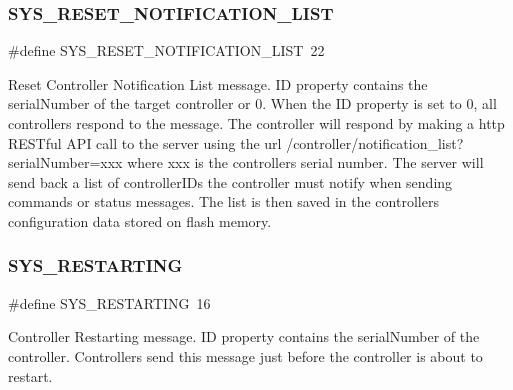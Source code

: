 \subsubsection{\texorpdfstring{S\+Y\+S\+\_\+\+R\+E\+S\+E\+T\+\_\+\+N\+O\+T\+I\+F\+I\+C\+A\+T\+I\+O\+N\+\_\+\+L\+I\+ST}{SYS\_RESET\_NOTIFICATION\_LIST}}
{\footnotesize\ttfamily \#define S\+Y\+S\+\_\+\+R\+E\+S\+E\+T\+\_\+\+N\+O\+T\+I\+F\+I\+C\+A\+T\+I\+O\+N\+\_\+\+L\+I\+ST~22}

Reset Controller Notification List message. ID property contains the serial\+Number of the target controller or 0. When the ID property is set to 0, all controllers respond to the message. The controller will respond by making a http R\+E\+S\+Tful A\+PI call to the server using the url /controller/notification\+\_\+list?serial\+Number=xxx where xxx is the controller\textquotesingle{}s serial number. The server will send back a list of controller\+I\+Ds the controller must notify when sending commands or status messages. The list is then saved in the controller\textquotesingle{}s configuration data stored on flash memory. \mbox{\label{group___u_d_p_message_i_d_ga9ed42f3a7fcc253fa49ce8ff33a75422}} 
\subsubsection{\texorpdfstring{S\+Y\+S\+\_\+\+R\+E\+S\+T\+A\+R\+T\+I\+NG}{SYS\_RESTARTING}}
{\footnotesize\ttfamily \#define S\+Y\+S\+\_\+\+R\+E\+S\+T\+A\+R\+T\+I\+NG~16}

Controller Restarting message. ID property contains the serial\+Number of the controller. Controllers send this message just before the controller is about to restart. \mbox{\label{group___u_d_p_message_i_d_ga9ea6e4272668196e99cdeb3c63652937}} 
